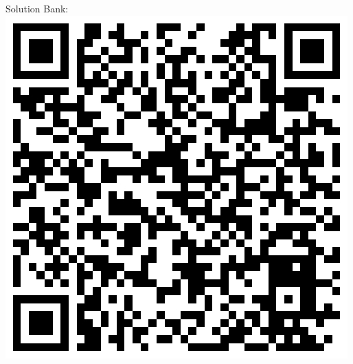 \documentclass[fleqn]{article}
\begin{document}
\begin{minipage}[b]{.13\textwidth}
	\sffamily%
	Solution Bank:
	\vspace{1mm}\linebreak
	\includegraphics[scale=0.15, valign=b]{images/link-to-y1-sol-bank}
\end{minipage}

\newpage
\end{document}
